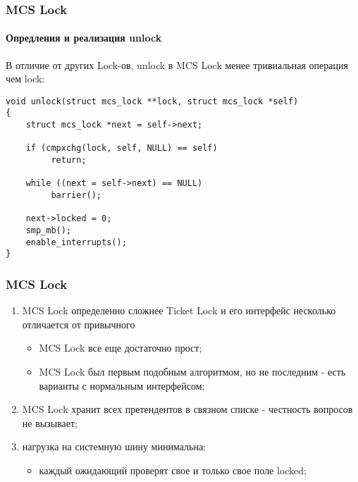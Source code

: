 \begin{frame}[fragile]
\frametitle{MCS Lock}
\framesubtitle{Опредления и реализация unlock}
В отличие от других Lock-ов, unlock в MCS Lock менее тривиальная операция чем lock:
\begin{lstlisting}
void unlock(struct mcs_lock **lock, struct mcs_lock *self)
{
    struct mcs_lock *next = self->next;

    if (cmpxchg(lock, self, NULL) == self)
         return;

    while ((next = self->next) == NULL)
         barrier();

    next->locked = 0;
    smp_mb();
    enable_interrupts();
}
\end{lstlisting}
\end{frame}

\begin{frame}
\frametitle{MCS Lock}

\begin{enumerate}
  \item MCS Lock определенно сложнее Ticket Lock и его интерфейс несколько
        отличается от привычного
        \begin{itemize}
          \item MCS Lock все еще достаточно прост;
          \item MCS Lock был первым подобным алгоритмом, но не последним - есть
                варианты с нормальным интерфейсом;
        \end{itemize}
  \item MCS Lock хранит всех претендентов в связном списке - честность
        вопросов не вызывает;
  \item нагрузка на системную шину минимальна:
        \begin{itemize}
          \item каждый ожидающий проверят свое и только свое поле locked;
        \end{itemize}
\end{enumerate}
\end{frame}
